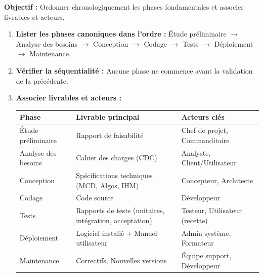 \documentclass[11pt]{article}
\begin{document}
\begin{methode}
\textbf{Objectif :} Ordonner chronologiquement les phases fondamentales et associer livrables et acteurs.
\begin{enumerate}
    \item \textbf{Lister les phases canoniques dans l'ordre :} Étude préliminaire $\rightarrow$ Analyse des besoins $\rightarrow$ Conception $\rightarrow$ Codage $\rightarrow$ Tests $\rightarrow$ Déploiement $\rightarrow$ Maintenance.
    \item \textbf{Vérifier la séquentialité :} Aucune phase ne commence avant la validation de la précédente.
    \item \textbf{Associer livrables et acteurs :}
    \begin{center}
    \begin{tabularx}{\linewidth}{|l|X|X|}
    \hline
    \rowcolor{popblueL}
    \textbf{Phase} & \textbf{Livrable principal} & \textbf{Acteurs clés} \\
    \hline
    Étude préliminaire & Rapport de faisabilité & Chef de projet, Commanditaire \\
    Analyse des besoins & Cahier des charges (CDC) & Analyste, Client/Utilisateur \\
    Conception & Spécifications techniques (MCD, Algos, IHM) & Concepteur, Architecte \\
    Codage & Code source & Développeur \\
    Tests & Rapports de tests (unitaires, intégration, acceptation) & Testeur, Utilisateur (recette) \\
    Déploiement & Logiciel installé + Manuel utilisateur & Admin système, Formateur \\
    Maintenance & Correctifs, Nouvelles versions & Équipe support, Développeur \\
    \hline
    \end{tabularx}
    \end{center}
\end{enumerate}
\end{methode}
\end{document}
